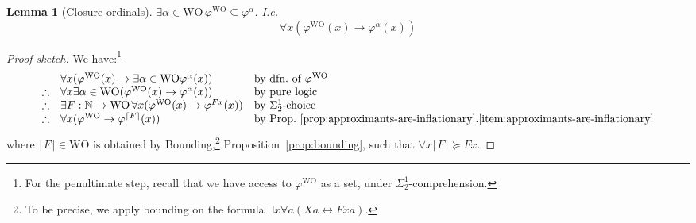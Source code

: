\documentclass[10pt,a4paper]{amsart}
\theoremstyle{plain}
\newtheorem{lemma}[lemma]{Lemma}
\theoremstyle{definition}
\renewcommand{\phi}{\varphi}
\newcommand{\oldtodo}[1]{\todo{#1}} %
\newcommand{\anupam}[1]{\todo[color=green]{A: #1}}
\renewcommand{\todo}[1]{}
\renewcommand{\anupam}[1]{}
\theoremstyle{plain}
\theoremstyle{definition} %
\newcommand{\Nat}{\mathbb{N}}
\renewcommand{\lor}{\vee}
\renewcommand{\land}{\wedge}
\newcommand{\limp}{\to}
\newcommand{\liff}{\leftrightarrow}
\newcommand{\Sin}[2]{\Sigma^{#1}_{#2}}
\newcommand{\Pin}[2]{\Pi^{#1}_{#2}}
\newcommand{\AC}{\mathsf{AC}}
\newcommand{\ac}[1]{#1\text{-}\AC}
\newcommand{\WO}{\mathrm{WO}}
\newcommand{\ordgeq}{\succeq}
\newcommand{\upbnd}[1]{\lceil #1\rceil}
\newcommand{\oper}[3]{\Lambda #1 \lambda #2 \, #3}
\newcommand{\apprx}[4]{(\oper #1 #2 #3)^{#4}}
\begin{document}
\begin{lemma}
    [Closure ordinals]
    \label{lem:closure-ordinals}
    $\exists \alpha \in \WO \, \phi^\WO \subseteq \phi^\alpha$.
    I.e.\ 
    \[
    \forall x (\phi^\WO(x) \limp \phi^\alpha(x))
    \]
\end{lemma}
\begin{proof}
    [Proof sketch]
    We have:\footnote{For the penultimate step, recall that we have access to $\phi^\WO$ as a set, under $\Sin 1 2$-comprehension.}
    \[
    \begin{array}{rll}
         & \forall x (\phi^\WO(x) \limp \exists \alpha \in \WO \phi^\alpha(x)) & \text{by dfn.\ of $\phi^\WO$}\\
         \therefore & \forall x \exists \alpha \in \WO (\phi^\WO(x) \limp \phi^\alpha(x)) & \text{by pure logic}\\
         \therefore & \exists F : \Nat \to \WO \, \forall x (\phi^\WO(x) \limp \phi^{Fx}(x))  & \text{by $\Sin 1 2 $-choice}\\
         \therefore & \forall x (\phi^\WO \limp \phi^{\upbnd F }(x)) & \text{by Prop.~\ref{prop:approximants-are-inflationary}.\ref{item:approximants-are-inflationary}}
    \end{array}
    \]
    where $\upbnd F\in \WO$ is obtained by Bounding,\footnote{To be precise, we apply bounding on the formula $\exists x \forall a (Xa \liff Fxa)$.} Proposition~\ref{prop:bounding}, such that $\forall x \upbnd F \ordgeq Fx$.
\end{proof}

\anupam{commented approximant collection below}
\end{document}
